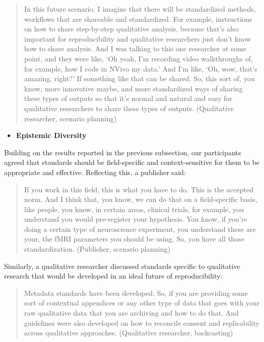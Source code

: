 \documentclass[authordate, meta]{jote-new-article}
\begin{document}
	\begin{quote}In this future scenario, I imagine that there will be standardized methods, workflows that are shareable and standardized. For example, instructions on how to share step-by-step qualitative analysis, because that's also important for reproducibility and qualitative researchers just don't know how to share analysis. And I was talking to this one researcher at some point, and they were like, ‘Oh yeah, I'm recording video walkthroughs of, for example, how I code in NVivo my data.' And I'm like, ‘Oh, wow, that's amazing, right?' If something like that can be shared. So, this sort of, you know, more innovative maybe, and more standardized ways of sharing these types of outputs so that it's normal and natural and easy for qualitative researchers to share these types of outputs. (Qualitative researcher, scenario planning)\end{quote}


\begin{itemize}[after=\vspace{-\baselineskip}]
	\item \textbf{Epistemic Diversity}
\end{itemize}



	\noindent Building on the results reported in the previous subsection, our participants agreed that standards should be field-specific and context-sensitive for them to be appropriate and effective. Reflecting this, a publisher said:



	\begin{quote}If you work in this field, this is what you have to do. This is the accepted norm. And I think that, you know, we can do that on a field-specific basis, like people, you know, in certain areas, clinical trials, for example, you understand you would pre-register your hypothesis. You know, if you're doing a certain type of neuroscience experiment, you understand these are your, the fMRI parameters you should be using. So, you have all those standardization. (Publisher, scenario planning)\end{quote}



	Similarly, a qualitative researcher discussed standards specific to qualitative research that would be developed in an ideal future of reproducibility:



	\begin{quote}Metadata standards have been developed. So, if you are providing some sort of contextual appendices or any other type of data that goes with your raw qualitative data that you are archiving and how to do that. And guidelines were also developed on how to reconcile consent and replicability across qualitative approaches. (Qualitative researcher, backcasting)\end{quote}
\end{document}
